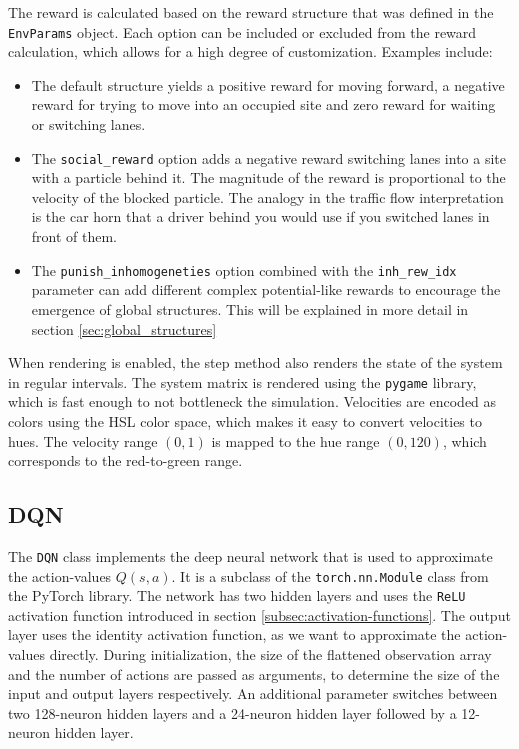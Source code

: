 The reward is calculated based on the reward structure that was defined in the \texttt{EnvParams} object. Each option can be included or excluded from the reward calculation, which allows for a high degree of customization. Examples include:
\begin{itemize}
    \item The default structure yields a positive reward for moving forward, a negative reward for trying to move into an occupied site and zero reward for waiting or switching lanes. 
    \item The \texttt{social\_reward} option adds a negative reward switching lanes into a site with a particle behind it. The magnitude of the reward is proportional to the velocity of the blocked particle. The analogy in the traffic flow interpretation is the car horn that a driver behind you would use if you switched lanes in front of them.
    \item The \texttt{punish\_inhomogeneties} option combined with the \texttt{inh\_rew\_idx} parameter can add different complex potential-like rewards to encourage the emergence of global structures. This will be explained in more detail in section \ref{sec:global_structures}
\end{itemize}
When rendering is enabled, the step method also renders the state of the system in regular intervals. The system matrix is rendered using the \texttt{pygame} library, which is fast enough to not bottleneck the simulation. Velocities are encoded as colors using the HSL color space, which makes it easy to convert velocities to hues. The velocity range $(0,1)$ is mapped to the hue range $(0,120)$, which corresponds to the red-to-green range. 



\subsection{DQN}
\label{subsec:implementation-dqn}
The \texttt{DQN} class implements the deep neural network that is used to approximate the action-values $Q(s,a)$. It is a subclass of the \texttt{torch.nn.Module} class from the PyTorch library. The network has two hidden layers and uses the \texttt{ReLU} activation function introduced in section \ref{subsec:activation-functions}. The output layer uses the identity activation function, as we want to approximate the action-values directly. During initialization, the size of the flattened observation array and the number of actions are passed as arguments, to determine the size of the input and output layers respectively. An additional parameter switches between two 128-neuron hidden layers and a 24-neuron hidden layer followed by a 12-neuron hidden layer. 



